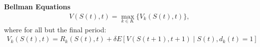 \begin{frame}
\textbf{Bellman Equations}\vspace{0.3cm}
\begin{align*}
V(S(t),t) = \max_{k \in K}\{V_k(S(t),t)\},
\end{align*}
where for all but the final period:
\begin{align*}
V_k(S(t),t) = R_k(S(t),t) + \delta E\left[V(S(t + 1), t + 1)\mid S(t), d_k(t) = 1\right]
\end{align*}
\end{frame}
